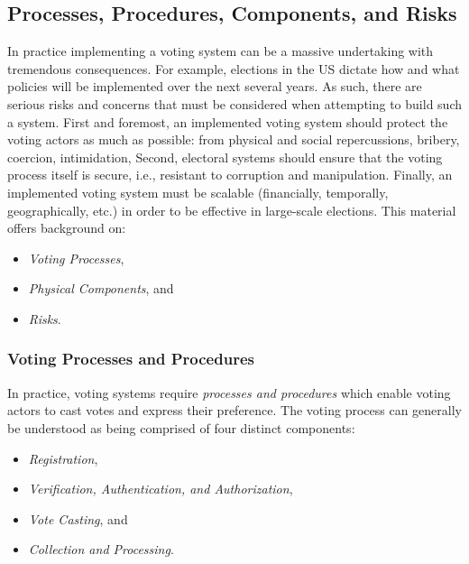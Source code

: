\subsection{Processes, Procedures, Components, and Risks}
In practice implementing a voting system can be a massive undertaking with
tremendous consequences. For example, elections in the US dictate how and what
policies will be implemented over the next several years. As such, there are
serious risks and concerns that must be considered when attempting to build such
a system. First and foremost, an implemented voting system should protect the
voting actors as much as possible: from physical and social repercussions,
bribery, coercion, intimidation, Second, electoral systems should ensure that
the voting process itself is secure, i.e., resistant to corruption and
manipulation. Finally, an implemented voting system must be scalable
(financially, temporally, geographically, etc.) in order to be effective in
large-scale elections. This material offers background on:

\begin{itemize}
  \item \emph{Voting Processes},
  \item \emph{Physical Components}, and
  \item \emph{Risks}.
\end{itemize}

\subsubsection{Voting Processes and Procedures}
In practice, voting systems require \emph{processes and procedures} which enable
voting actors to cast votes and express their preference. The voting process can
generally be understood as being comprised of four distinct components:

\begin{itemize}
  \item \emph{Registration},
  \item \emph{Verification, Authentication, and Authorization},
  \item \emph{Vote Casting}, and
  \item \emph{Collection and Processing}.
\end{itemize}

